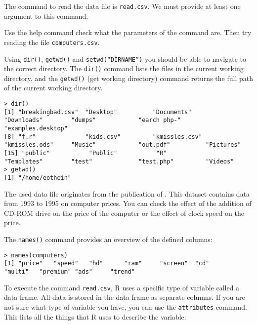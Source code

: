 The command to read the data file is \texttt{read.csv}. We must provide at least one argument to this command.


\begin{exercise}
    Use the help command  check what the parameters of the command are. Then try reading the file \texttt{computers.csv}.
\end{exercise}

Using \texttt{dir()}, \texttt{getwd()} and \texttt{setwd(``DIRNAME'')} you should be able to navigate to the correct directory. The \texttt{dir()} command lists the files in the current working directory, and the \texttt{getwd()} (get working directory) command returns the full path of the current working directory.

\begin{lstlisting}[breaklines=true]
> dir()
[1] "breakingbad.csv"  "Desktop"          "Documents"        "Downloads"        "dumps"            "earch php-"       "examples.desktop"
[8] "f.r"              "kids.csv"         "kmissles.csv"     "kmissles.ods"     "Music"            "out.pdf"          "Pictures"        
[15] "public"           "Public"           "R"                "Templates"        "test"             "test.php"         "Videos"          
> getwd()
[1] "/home/eothein"
\end{lstlisting}

The used data file originates from the publication of \autocite{Stengos2005}. 
This dataset contains data from 1993 to 1995 on computer prices. 
You can check the effect of the addition of CD-ROM drive on the price of the computer or the effect of clock speed on the price.

The \texttt{names()} command provides an overview of the defined columns:

\begin{lstlisting}[breaklines=true]
> names(computers)
[1] "price"   "speed"   "hd"      "ram"     "screen"  "cd"      "multi"   "premium" "ads"     "trend"
\end{lstlisting}

To execute the command \texttt{read.csv}, R uses a specific type of variable called a data frame. 
All data is stored in the data frame as separate columns.
If you are not sure what type of variable you have, you can use the \texttt{attributes} command.
This lists all the things that R uses to describe the variable:

